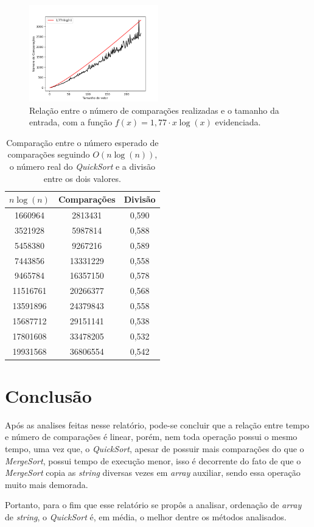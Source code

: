 \documentclass[12pt,a4paper,oneside]{article}
\begin{document}
\begin{figure}[H]
\begin{center}
    \includegraphics[width=0.5\textwidth]{FigQnlogn.png} 
\end{center}
\caption{Relação entre o número de comparações realizadas e o tamanho da entrada, com a função $f(x)=1,77\cdot x\log{(x)}$ evidenciada.}
\label{fig:qOK}
\end{figure}

\begin{table}[H]
\caption{Comparação entre o número esperado de comparações seguindo $O(n\log{(n)})$, o número real do \textit{QuickSort} e a divisão entre os dois valores.}
\label{tab:qOK}
\begin{center}
\begin{tabular}{|c c c|}
\hline
$n\log{(n)}$ & Comparações  & Divisão\\
\hline
1660964 & 2813431 & 0,590\\
3521928 & 5987814 & 0,588\\
5458380 & 9267216 & 0,589\\
7443856 & 13331229 & 0,558\\
9465784 & 16357150 & 0,578\\
11516761 & 20266377 & 0,568\\
13591896 & 24379843 & 0,558\\
15687712 & 29151141 & 0,538\\
17801608 & 33478205 & 0,532\\
19931568 & 36806554 & 0,542\\
\hline
\end{tabular}
\end{center}
\end{table}

\section{Conclusão}

\quad Após as analises feitas nesse relatório, pode-se concluir que a relação entre tempo e número de comparações é linear, porém, nem toda operação possui o mesmo tempo, uma vez que, o \textit{QuickSort}, apesar de possuir mais comparações do que o \textit{MergeSort}, possui tempo de execução menor, isso é decorrente do fato de que o \textit{MergeSort} copia as \textit{string} diversas vezes em \textit{array} auxiliar, sendo essa operação muito mais demorada.

\quad Portanto, para o fim que esse relatório se propôs a analisar, ordenação de \textit{array} de \textit{string}, o \textit{QuickSort} é, em média, o melhor dentre os métodos analisados.
\end{document}
